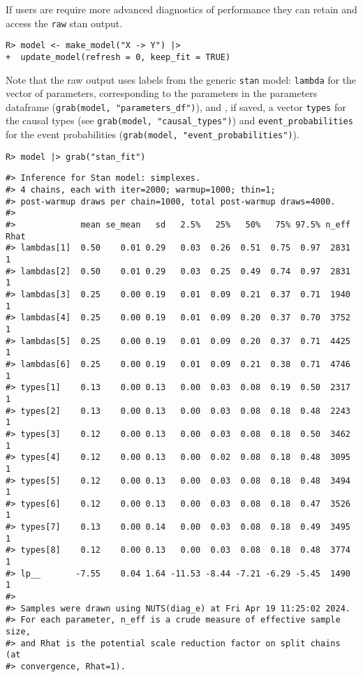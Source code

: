 \documentclass[
  11pt,
  article]{jss}
\begin{document}
If users are require more advanced diagnostics of performance they can
retain and access the \texttt{raw} stan output.

\begin{verbatim}
R> model <- make_model("X -> Y") |> 
+  update_model(refresh = 0, keep_fit = TRUE)
\end{verbatim}

Note that the raw output uses labels from the generic \texttt{stan}
model: \texttt{lambda} for the vector of parameters, corresponding to
the parameters in the parameters dataframe
(\texttt{grab(model,\ "parameters\_df")}), and , if saved, a vector
\texttt{types} for the causal types (see
\texttt{grab(model,\ "causal\_types")}) and
\texttt{event\_probabilities} for the event probabilities
(\texttt{grab(model,\ "event\_probabilities")}).

\begin{verbatim}
R> model |> grab("stan_fit")
\end{verbatim}

\begin{verbatim}
#> Inference for Stan model: simplexes.
#> 4 chains, each with iter=2000; warmup=1000; thin=1; 
#> post-warmup draws per chain=1000, total post-warmup draws=4000.
#> 
#>             mean se_mean   sd   2.5%   25%   50%   75% 97.5% n_eff Rhat
#> lambdas[1]  0.50    0.01 0.29   0.03  0.26  0.51  0.75  0.97  2831    1
#> lambdas[2]  0.50    0.01 0.29   0.03  0.25  0.49  0.74  0.97  2831    1
#> lambdas[3]  0.25    0.00 0.19   0.01  0.09  0.21  0.37  0.71  1940    1
#> lambdas[4]  0.25    0.00 0.19   0.01  0.09  0.20  0.37  0.70  3752    1
#> lambdas[5]  0.25    0.00 0.19   0.01  0.09  0.20  0.37  0.71  4425    1
#> lambdas[6]  0.25    0.00 0.19   0.01  0.09  0.21  0.38  0.71  4746    1
#> types[1]    0.13    0.00 0.13   0.00  0.03  0.08  0.19  0.50  2317    1
#> types[2]    0.13    0.00 0.13   0.00  0.03  0.08  0.18  0.48  2243    1
#> types[3]    0.12    0.00 0.13   0.00  0.03  0.08  0.18  0.50  3462    1
#> types[4]    0.12    0.00 0.13   0.00  0.02  0.08  0.18  0.48  3095    1
#> types[5]    0.12    0.00 0.13   0.00  0.03  0.08  0.18  0.48  3494    1
#> types[6]    0.12    0.00 0.13   0.00  0.03  0.08  0.18  0.47  3526    1
#> types[7]    0.13    0.00 0.14   0.00  0.03  0.08  0.18  0.49  3495    1
#> types[8]    0.12    0.00 0.13   0.00  0.03  0.08  0.18  0.48  3774    1
#> lp__       -7.55    0.04 1.64 -11.53 -8.44 -7.21 -6.29 -5.45  1490    1
#> 
#> Samples were drawn using NUTS(diag_e) at Fri Apr 19 11:25:02 2024.
#> For each parameter, n_eff is a crude measure of effective sample size,
#> and Rhat is the potential scale reduction factor on split chains (at 
#> convergence, Rhat=1).
\end{verbatim}
\end{document}
